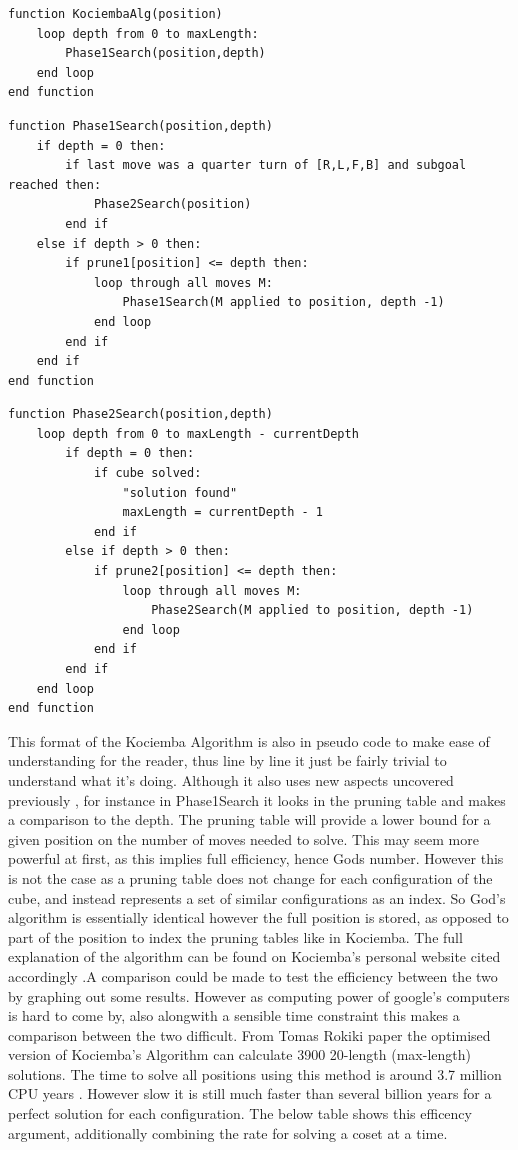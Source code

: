 \documentclass{article}
\begin{document}
\begin{lstlisting}
function KociembaAlg(position)
	loop depth from 0 to maxLength:
		Phase1Search(position,depth)
	end loop
end function
\end{lstlisting}
\begin{lstlisting}
function Phase1Search(position,depth)
	if depth = 0 then:
		if last move was a quarter turn of [R,L,F,B] and subgoal reached then:
			Phase2Search(position)
		end if
	else if depth > 0 then:
		if prune1[position] <= depth then:
			loop through all moves M:
				Phase1Search(M applied to position, depth -1)
			end loop
		end if
	end if
end function
\end{lstlisting}
\begin{lstlisting}
function Phase2Search(position,depth)
	loop depth from 0 to maxLength - currentDepth
		if depth = 0 then:
			if cube solved:
				"solution found"
				maxLength = currentDepth - 1
			end if
		else if depth > 0 then:
			if prune2[position] <= depth then:
				loop through all moves M:
					Phase2Search(M applied to position, depth -1)
				end loop
			end if
		end if
	end loop
end function
\end{lstlisting}
This format of the Kociemba Algorithm is also in pseudo code to make ease of understanding for the reader, thus line by line it just be fairly trivial to understand what it's doing. Although it also uses new aspects uncovered previously , for instance in Phase1Search it looks in the pruning table and makes a comparison to the depth. The pruning table will provide a lower bound for a given position on the number of moves needed to solve. This may seem more powerful at first, as this implies full efficiency, hence Gods number. However this is not the case as a pruning table does not change for each configuration of the cube, and instead represents a set of similar configurations as an index. So God's algorithm is essentially identical however the full position is stored, as opposed to part of the position to index the pruning tables like in Kociemba. The full explanation of the algorithm can be found on Kociemba's personal website cited accordingly \cite{kocweb}.\newline A comparison could be made to test the efficiency between the two by graphing out some results. However as computing power of google's computers is hard to come by, also alongwith a sensible time constraint this makes a comparison between the two difficult. From Tomas Rokiki paper the optimised version of Kociemba's Algorithm can calculate 3900 20-length (max-length) solutions. The time to solve all positions using this method is around 3.7 million CPU years \cite{Rokicki2013TheDO}. However slow it is still much faster than several billion years for a perfect solution for each configuration. The below table shows this efficency argument, additionally combining the rate for solving a coset at a time.
\end{document}
